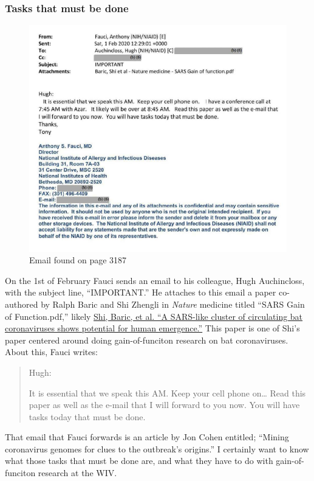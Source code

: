 \documentclass[11pt]{article}
\begin{document}
\subsubsection{Tasks that must be done}
\label{sec:orgf3ef56e}
\begin{figure}[htbp]
\centering
\includegraphics[width=.9\linewidth]{./images/email-tasks-that-must-be-done.png}
\caption{Email found on page 3187}
\end{figure}
On the 1st of February Fauci sends an email to his colleague, Hugh Auchincloss, with the subject line, ``IMPORTANT.'' He attaches to this email a paper co-authored by Ralph Baric and Shi Zhengli in \emph{Nature} medicine titled ``SARS Gain of Function.pdf,'' likely \href{https://www.nature.com/articles/nm.3985/}{Shi, Baric, et al. ``A SARS-like cluster of circulating bat coronaviruses shows potential for human emergence.''} This paper is one of Shi's paper centered around doing gain-of-funciton research on bat coronaviruses. About this, Fauci writes:
\begin{quote}
Hugh:

It is essential that we speak this AM. Keep your cell phone on\ldots{} Read this paper as well as the e-mail that I will forward to you now. You will have tasks today that must be done.
\end{quote}
That email that Fauci forwards is an article by Jon Cohen entitled; ``Mining coronavirus genomes for clues to the outbreak's origins.'' I certainly want to know what those tasks that must be done are, and what they have to do with gain-of-funciton research at the WIV.
\end{document}
